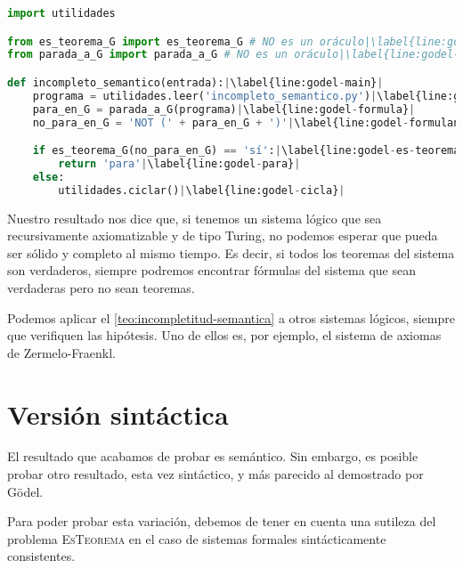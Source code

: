 \begin{lstlisting}[language=Python, caption=\lstinline{godel.py},label={lst:godel}]
import utilidades

from es_teorema_G import es_teorema_G # NO es un oráculo|\label{line:godel-import1}|
from parada_a_G import parada_a_G # NO es un oráculo|\label{line:godel-import2}|

def incompleto_semantico(entrada):|\label{line:godel-main}|
    programa = utilidades.leer('incompleto_semantico.py')|\label{line:godel-programa}|
    para_en_G = parada_a_G(programa)|\label{line:godel-formula}|
    no_para_en_G = 'NOT (' + para_en_G + ')'|\label{line:godel-formulaneg}|

    if es_teorema_G(no_para_en_G) == 'sí':|\label{line:godel-es-teorema}|
        return 'para'|\label{line:godel-para}|
    else:
        utilidades.ciclar()|\label{line:godel-cicla}|
\end{lstlisting}


Nuestro resultado nos dice que, si tenemos un sistema lógico que sea recursivamente axiomatizable y de tipo Turing, no podemos esperar que pueda ser sólido y completo al mismo tiempo. Es decir, si todos los teoremas del sistema son verdaderos, siempre podremos encontrar fórmulas del sistema que sean verdaderas pero no sean teoremas.

Podemos aplicar el \cref{teo:incompletitud-semantica} a otros sistemas lógicos, siempre que verifiquen las hipótesis. Uno de ellos es, por ejemplo, el sistema de axiomas de Zermelo-Fraenkl.

\section{Versión sintáctica}\label{sec:version-sintactica}

El resultado que acabamos de probar es semántico. Sin embargo, es posible probar otro resultado, esta vez sintáctico, y más parecido al demostrado por Gödel.

Para poder probar esta variación, debemos de tener en cuenta una sutileza del problema \textsc{EsTeorema} en el caso de sistemas formales sintácticamente consistentes.

